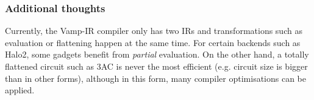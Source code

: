 \documentclass[
    9pt,            %
    techreport,        %
    affiltop,       %
]{art}
\begin{document}
\subsubsection{Additional thoughts}

Currently, the Vamp-IR compiler only has two IRs and transformations such as evaluation or flattening happen at the same time. For certain backends such as Halo2, some gadgets benefit from \textit{partial} evaluation. On the other hand, a totally flattened circuit such as 3AC is never the most efficient (e.g. circuit size is bigger than in other forms), although in this form, many compiler optimisations can be applied.






\nocite{*}

\end{document}

